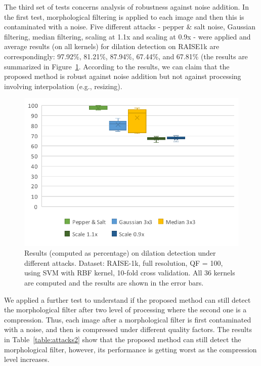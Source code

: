 \documentclass[review]{elsarticle}
\begin{document}
The third set of tests concerns analysis of robustness against noise addition. In the first test, morphological filtering is applied to each image and then this is contaminated with a noise. Five different attacks - pepper \& salt noise, Gaussian filtering, median filtering, scaling at 1.1x and scaling at 0.9x - were applied and average results (on all kernels) for dilation detection on RAISE1k are correspondingly: 97.92\%, 81.21\%, 87.94\%, 67.44\%, and 67.81\% (the results are summarized in Figure~\ref{fig:attacks_1}. According to the results, we can claim that the proposed method is robust against noise addition but not against processing involving interpolation (e.g., resizing). 

\begin{figure}[h!]
	\centering
	\includegraphics[width=0.7\linewidth]{attacks_1.pdf}
	\caption{Results (computed as percentage) on dilation detection under different attacks. Dataset: RAISE-1k, full resolution, QF = 100, using SVM with RBF kernel, 10-fold cross validation. All 36 kernels are computed and the results are shown in the error bars.}
	\label{fig:attacks_1}
\end{figure}

We applied a further test to understand if the proposed method can still detect the morphological filter after two level of processing where the second one is a compression. Thus, each image after a morphological filter is first contaminated with a noise, and then is compressed under different quality factors.  The results in Table~\ref{table:attacks2} show that the proposed method can still detect the morphological filter, however, its performance is getting worst as the compression level increases.  
\end{document}

